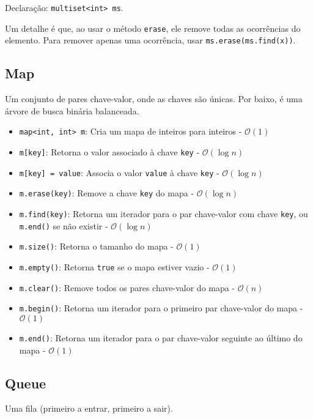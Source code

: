 Declaração: \texttt{multiset<int> ms}.

Um detalhe é que, ao usar o método \texttt{erase}, ele remove todas as ocorrências do elemento. Para remover apenas uma ocorrência, usar \texttt{ms.erase(ms.find(x))}.

\subsection{Map}

Um conjunto de pares chave-valor, onde as chaves são únicas. Por baixo, é uma árvore de busca binária balanceada.

\begin{itemize}
    \item \texttt{map<int, int> m}: Cria um mapa de inteiros para inteiros - $\mathcal{O}(1)$
    \item \texttt{m[key]}: Retorna o valor associado à chave \texttt{key} - $\mathcal{O}(\log n)$
    \item \texttt{m[key] = value}: Associa o valor \texttt{value} à chave \texttt{key} - $\mathcal{O}(\log n)$
    \item \texttt{m.erase(key)}: Remove a chave \texttt{key} do mapa - $\mathcal{O}(\log n)$
    \item \texttt{m.find(key)}: Retorna um iterador para o par chave-valor com chave \texttt{key}, ou \texttt{m.end()} se não existir - $\mathcal{O}(\log n)$
    \item \texttt{m.size()}: Retorna o tamanho do mapa - $\mathcal{O}(1)$
    \item \texttt{m.empty()}: Retorna \texttt{true} se o mapa estiver vazio - $\mathcal{O}(1)$
    \item \texttt{m.clear()}: Remove todos os pares chave-valor do mapa - $\mathcal{O}(n)$
    \item \texttt{m.begin()}: Retorna um iterador para o primeiro par chave-valor do mapa - $\mathcal{O}(1)$
    \item \texttt{m.end()}: Retorna um iterador para o par chave-valor seguinte ao último do mapa - $\mathcal{O}(1)$
\end{itemize}

\subsection{Queue}

Uma fila (primeiro a entrar, primeiro a sair).

